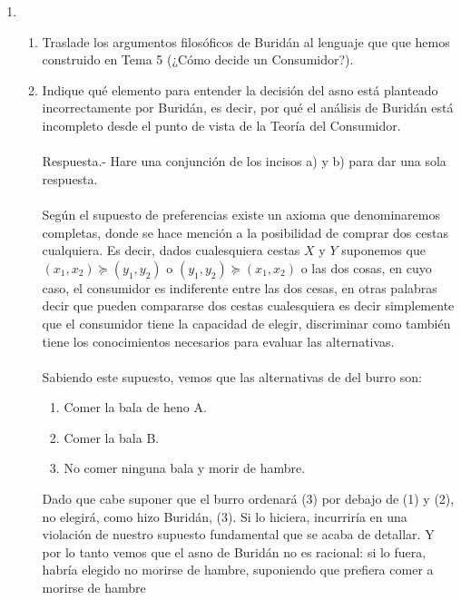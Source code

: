 \begin{enumerate}
\begin{enumerate}[\bfseries 1.]
    \end{enumerate}

\item 
    \begin{enumerate}[\bfseries a)]

	\item Traslade los argumentos filosóficos de Buridán al lenguaje que que hemos construido en Tema 5 (¿Cómo decide un Consumidor?).
	\item Indique qué elemento para entender la decisión del asno está planteado incorrectamente por Buridán, es decir, por qué el análisis de Buridán está incompleto desde el punto de vista de la Teoría del Consumidor.\\\\
	   Respuesta.-\; Hare una conjunción de los incisos a) y b) para dar una sola respuesta.\\\\ 
	    Según el supuesto de preferencias existe un axioma que denominaremos completas, donde se hace mención a la posibilidad de comprar dos cestas cualquiera. Es decir, dados cualesquiera cestas $X$ y $Y$ suponemos que $(x_1,x_2)\succeq (y_1,y_2)$ o $(y_1,y_2)\succeq (x_1,x_2)$ o las dos cosas, en cuyo caso, el consumidor es indiferente entre las dos cesas, en otras palabras decir que pueden compararse dos cestas cualesquiera es decir simplemente que el consumidor tiene la capacidad de elegir, discriminar como también tiene los conocimientos necesarios para evaluar las alternativas.\\\\
	    Sabiendo este supuesto, vemos que las alternativas de del burro son: 
	    \begin{enumerate}[1)]
		\item Comer la bala de heno A.
		\item Comer la bala B. 
		\item No comer ninguna bala y morir de hambre. 
	    \end{enumerate}
	    Dado que cabe suponer que el burro ordenará (3) por debajo de (1) y (2), no elegirá, como hizo Buridán, (3). Si lo hiciera, incurriría en una violación de nuestro supuesto fundamental que se acaba de detallar. Y por lo tanto vemos que el asno de Buridán no es racional: si lo fuera, habría elegido no morirse de hambre, suponiendo que prefiera comer a morirse de hambre\\\\


\end{enumerate}
\end{enumerate}
